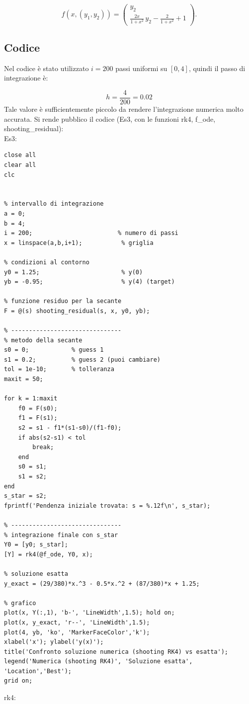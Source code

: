 \documentclass[11pt]{article}
\begin{document}
\[
f(x, (y_1, y_2)) = 
\begin{pmatrix}
y_2 \\
\displaystyle \frac{2x}{1 + x^2} \, y_2 - \frac{2}{1 + x^2} + 1
\end{pmatrix}.
\]
\subsection{Codice}
Nel codice è stato utilizzato \( i = 200 \) passi uniformi su \( [0, 4] \),  
quindi il passo di integrazione è:

\[
h = \frac{4}{200} = 0.02
\]
Tale valore è sufficientemente piccolo da rendere l'integrazione numerica molto accurata.
Si rende pubblico il codice (Es3, con le funzioni rk4, f\_ode, shooting\_residual):\\
Es3:
\begin{lstlisting}
close all
clear all
clc


% intervallo di integrazione
a = 0; 
b = 4;
i = 200;                        % numero di passi
x = linspace(a,b,i+1);           % griglia

% condizioni al contorno
y0 = 1.25;                       % y(0)
yb = -0.95;                      % y(4) (target)

% funzione residuo per la secante
F = @(s) shooting_residual(s, x, y0, yb);

% -------------------------------
% metodo della secante
s0 = 0;            % guess 1
s1 = 0.2;          % guess 2 (puoi cambiare)
tol = 1e-10;       % tolleranza
maxit = 50;

for k = 1:maxit
    f0 = F(s0);
    f1 = F(s1);
    s2 = s1 - f1*(s1-s0)/(f1-f0);
    if abs(s2-s1) < tol
        break;
    end
    s0 = s1;
    s1 = s2;
end
s_star = s2;
fprintf('Pendenza iniziale trovata: s = %.12f\n', s_star);

% -------------------------------
% integrazione finale con s_star
Y0 = [y0; s_star];
[Y] = rk4(@f_ode, Y0, x);

% soluzione esatta
y_exact = (29/380)*x.^3 - 0.5*x.^2 + (87/380)*x + 1.25;

% grafico
plot(x, Y(:,1), 'b-', 'LineWidth',1.5); hold on;
plot(x, y_exact, 'r--', 'LineWidth',1.5);
plot(4, yb, 'ko', 'MarkerFaceColor','k');
xlabel('x'); ylabel('y(x)');
title('Confronto soluzione numerica (shooting RK4) vs esatta');
legend('Numerica (shooting RK4)', 'Soluzione esatta', 'Location','Best');
grid on;
\end{lstlisting}
rk4:
\end{document}
